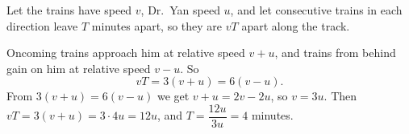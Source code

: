 Let the trains have speed $v$, Dr.\ Yan speed $u$, and let consecutive trains in each direction leave $T$ minutes apart, so they are $vT$ apart along the track.

Oncoming trains approach him at relative speed $v+u$, and trains from behind gain on him at relative speed $v-u$. So
\[
vT=3(v+u)=6(v-u).
\]
From $3(v+u)=6(v-u)$ we get $v+u=2v-2u$, so $v=3u$. Then $vT=3(v+u)=3\cdot4u=12u$, and $T=\dfrac{12u}{3u}=\boxed{4}$ minutes.
